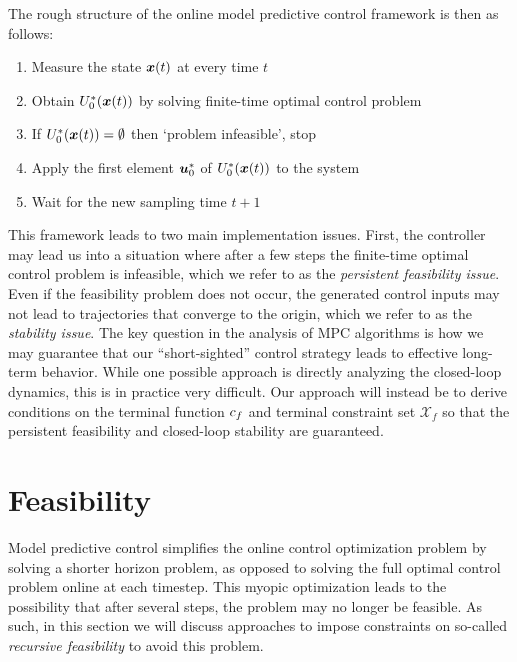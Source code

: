 The rough structure of the online model predictive control framework is then as follows:
\begin{enumerate}
    \item Measure the state $\bm{x}(t)$ at every time $t$
    \item Obtain $U^*_0(\bm{x}(t))$ by solving finite-time optimal control problem
    \item If $U^*_0(\bm{x}(t)) = \emptyset$ then `problem infeasible', stop
    \item Apply the first element $\bm{u}^*_0$ of $U^*_0(\bm{x}(t))$ to the system
    \item Wait for the new sampling time $t+1$
\end{enumerate}
This framework leads to two main implementation issues. First, the controller may lead us into a situation where after a few steps the finite-time optimal control problem is infeasible, which we refer to as the \textit{persistent feasibility issue}. Even if the feasibility problem does not occur, the generated control inputs may not lead to trajectories that converge to the origin, which we refer to as the \textit{stability issue}. The key question in the analysis of MPC algorithms is how we may guarantee that our ``short-sighted'' control strategy leads to effective long-term behavior. While one possible approach is directly analyzing the closed-loop dynamics, this is in practice very difficult. Our approach will instead be to derive conditions on the terminal function $c_f$ and terminal constraint set $\mathcal{X}_f$ so that the persistent feasibility and closed-loop stability are guaranteed. 

\section{Feasibility}

Model predictive control simplifies the online control optimization problem by solving a shorter horizon problem, as opposed to solving the full optimal control problem online at each timestep. This myopic optimization leads to the possibility that after several steps, the problem may no longer be feasible. As such, in this section we will discuss approaches to impose constraints on so-called \textit{recursive feasibility} to avoid this problem. 

